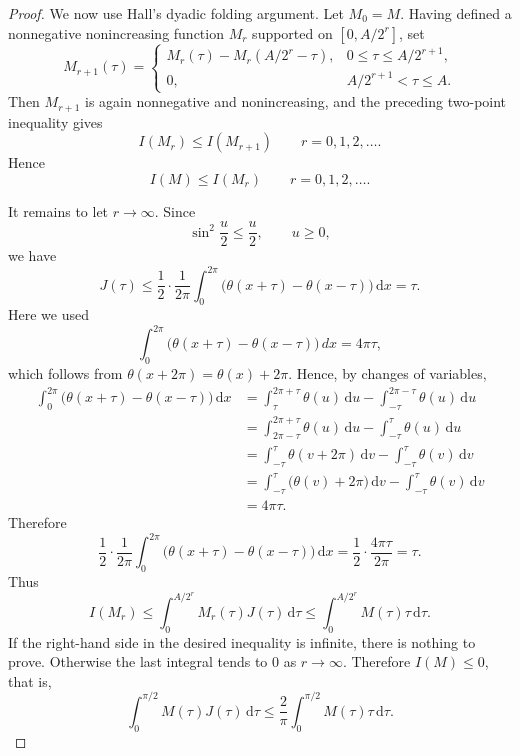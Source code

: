 \documentclass[11pt]{amsart}
\theoremstyle{remark}
\newcommand{\dd}{\mathrm d}
\numberwithin{equation}{section}
\begin{document}
\begin{proof}
We now use Hall's dyadic folding argument. Let $M_0=M$. Having defined
a nonnegative nonincreasing function $M_r$ supported on $[0,A/2^r]$, set
\[
        M_{r+1}(\tau)
        =
        \begin{cases}
        M_r(\tau)-M_r(A/2^r-\tau),
        &0\leq \tau\leq A/2^{r+1},\\[4pt]
        0,
        &A/2^{r+1}<\tau\leq A.
        \end{cases}
\]
Then $M_{r+1}$ is again nonnegative and nonincreasing, and the preceding
two-point inequality gives
\[
        I(M_r)\leq I(M_{r+1})
        \qquad r=0,1,2,\ldots .
\]
Hence
\[
        I(M)\leq I(M_r)
        \qquad r=0,1,2,\ldots .
\]

It remains to let $r\to\infty$. Since
\[
        \sin^2\frac{u}{2}\leq \frac{u}{2},
        \qquad u\geq 0,
\]
we have
\[
        J(\tau)
        \leq
        \frac12\cdot
        \frac1{2\pi}\int_0^{2\pi}
        \bigl(\theta(x+\tau)-\theta(x-\tau)\bigr)\,\dd x
        =
        \tau .
\]
Here we used
\[
\int_0^{2\pi}\bigl(\theta(x+\tau)-\theta(x-\tau)\bigr)\,dx=4\pi\tau,
\]
which follows from \(\theta(x+2\pi)=\theta(x)+2\pi\).
Hence, by changes of variables,
\[
\begin{aligned}
\int_0^{2\pi}\!\bigl(\theta(x+\tau)-\theta(x-\tau)\bigr)\,\dd x
&=
\int_\tau^{2\pi+\tau}\theta(u)\,\dd u
-
\int_{-\tau}^{2\pi-\tau}\theta(u)\,\dd u        \\
&=
\int_{2\pi-\tau}^{2\pi+\tau}\theta(u)\,\dd u
-
\int_{-\tau}^{\tau}\theta(u)\,\dd u             \\
&=
\int_{-\tau}^{\tau}\theta(v+2\pi)\,\dd v
-
\int_{-\tau}^{\tau}\theta(v)\,\dd v             \\
&=
\int_{-\tau}^{\tau}\bigl(\theta(v)+2\pi\bigr)\,\dd v
-
\int_{-\tau}^{\tau}\theta(v)\,\dd v             \\
&=4\pi\tau .
\end{aligned}
\]
Therefore
\[
        \frac12\cdot
        \frac1{2\pi}\int_0^{2\pi}
        \bigl(\theta(x+\tau)-\theta(x-\tau)\bigr)\,\dd x
        =
        \frac12\cdot\frac{4\pi\tau}{2\pi}
        =
        \tau .
\]
Thus
\[
        I(M_r)
        \leq
        \int_0^{A/2^r} M_r(\tau)J(\tau)\,\dd\tau
        \leq
        \int_0^{A/2^r} M(\tau)\tau\,\dd\tau .
\]
If the right-hand side in the desired inequality is infinite, there is
nothing to prove. Otherwise the last integral tends to $0$ as
$r\to\infty$. Therefore $I(M)\leq 0$, that is,
\[
        \int_0^{\pi/2} M(\tau)J(\tau)\,\dd\tau
        \leq
        \frac2\pi
        \int_0^{\pi/2} M(\tau)\tau\,\dd\tau .
\]
\end{proof}
\end{document}
